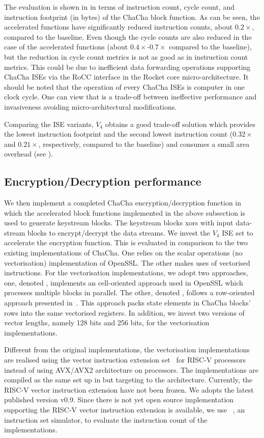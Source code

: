 The evaluation is shown in  in terms of instruction count, cycle count, and instruction footprint (in bytes) of the ChaCha block function. As can be seen, the accelerated functions have significantly reduced instruction counts, about $0.2\times$, compared to the baseline. Even though the cycle counts are also reduced in the case of the accelerated functions (about $0.4\times$-$0.7\times$ compared to the baseline), but the reduction in cycle count metrics is not as good as in instruction count metrics. This could be due to inefficient data forwarding operations supporting ChaCha ISEs via the RoCC interface in the Rocket core micro-architecture. It should be noted that the operation of every ChaCha ISEs is computer in one clock cycle. One can view that is a trade-off between ineffective performance and invasiveness avoiding micro-architectural modifications.

Comparing the ISE variants, $V_4$ obtains a good trade-off solution which provides the lowest instruction footprint and the second lowest instruction count ($0.32\times$ and $0.21\times$, respectively, compared to the baseline) and consumes a small area overhead (see ).

\subsection{Encryption/Decryption performance}
We then implement a completed ChaCha encryption/decryption function in which the accelerated block functions implemented in the above subsection is used to generate keystream blocks. The keystream blocks xors with input data-stream blocks to encrypt/decrypt the data streams. We invest the $V_4$ ISE set to accelerate the encryption function. This is evaluated in comparison to the two existing implementations of ChaCha.
One relies on the scalar  operations (no vectorisation) implementation of OpenSSL. 
The other makes uses of vectorised instructions. 
For the vectorisation implementations, we adopt two approaches, one, denoted , implements an cell-oriented approach used in OpenSSL which processes multiple blocks in parallel.
The other, denoted , follows a row-oriented approach presented in~\cite{GolGue:14}. This approach packs state elements in ChaCha blocks' rows into the same vectorised registers.
In addition, we invest two versions of vector lengths, namely 128 bits and 256 bits, for the vectorisation implementations. 

Different from the original implementations, the vectorisation implementations are realised using the vector instruction extension set~\cite{riscv:ext:vector:draft} for RISC-V processors instead of using AVX/AVX2 architecture on  processors.
The implementations are compiled as the same set up in  but targeting to the  architecture. 
Currently, the RISC-V vector instruction extension have not been frozen. We adopts the latest published version v0.9. Since there is not yet open source implementation supporting the RISC-V vector instruction extension is available, we use ~\cite{Spike}, an instruction set simulator, to evaluate the instruction count of the implementations.

